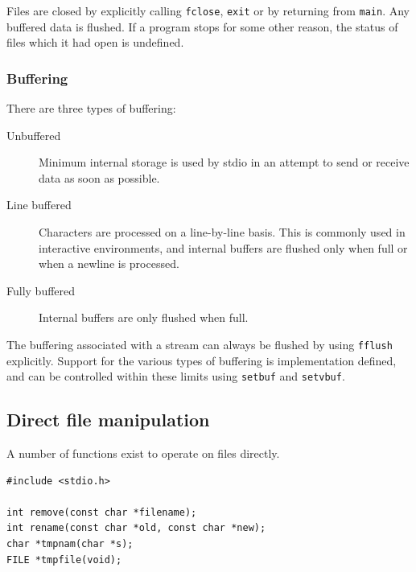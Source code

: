     Files are closed by explicitly calling \texttt{fclose},
     \texttt{exit} or by returning from \texttt{main}.  Any buffered
     data is flushed.  If a program stops for some other reason, the status of
     files which it had open is undefined.


   

   \subsubsection{Buffering}
    

    There are three types of buffering:


    \begin{description}
     \item[Unbuffered] Minimum internal storage is used by stdio in an attempt
      to send or receive data as soon as possible.

     \item[Line buffered] Characters are processed on a line-by-line basis.  This
      is commonly used in interactive environments, and
      internal buffers are flushed only when full or when a
      newline is processed.

     \item[Fully buffered] Internal buffers are only flushed when full.
    \end{description}

    The buffering associated with a stream can always be flushed by using
     \texttt{fflush} explicitly.  Support for the various types of
     buffering is implementation defined, and can be controlled within these
     limits using \texttt{setbuf} and \texttt{setvbuf}.


   

  

  \subsection{Direct file manipulation}
   

   A number of functions exist to operate on files directly.


   \begin{Verbatim}
#include <stdio.h>

int remove(const char *filename);
int rename(const char *old, const char *new);
char *tmpnam(char *s);
FILE *tmpfile(void);
\end{Verbatim}

